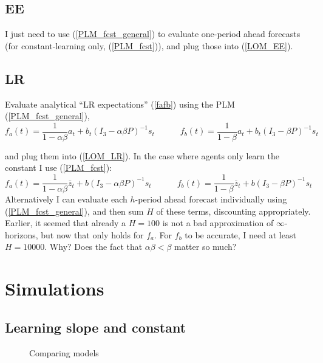 \documentclass[11pt]{article}
\def \myFigPath {../figures/}
\renewcommand{\[}{\begin{equation}}
\renewcommand{\]}{\end{equation}}
\def\myFigScale{0.3}
\begin{document}
\subsection{EE}
I just need to use (\ref{PLM_fcst_general}) to evaluate one-period ahead forecasts (for constant-learning only, (\ref{PLM_fcst})), and plug those into (\ref{LOM_EE}).

\subsection{LR}
Evaluate analytical ``LR expectations'' (\ref{fafb}) using the PLM (\ref{PLM_fcst_general}), 
\begin{equation}
f_a(t) = \frac{1}{1-\alpha\beta}a_{t}  + b_{t}(I_3 - \alpha\beta P)^{-1}s_t \quad \quad \quad f_b(t) = \frac{1}{1-\beta}a_{t}  + b_{t}(I_3 - \beta P)^{-1}s_t  \label{fafb_analytical_general}
\end{equation}

and plug them into (\ref{LOM_LR}). In the case where agents only learn the constant I use (\ref{PLM_fcst}):
\begin{equation}
f_a(t) = \frac{1}{1-\alpha\beta}\bar{z}_{t}  + b(I_3 - \alpha\beta P)^{-1}s_t \quad \quad \quad f_b(t) = \frac{1}{1-\beta}\bar{z}_{t}  + b(I_3 - \beta P)^{-1}s_t  \label{fafb_analytical}
\end{equation}
Alternatively I can evaluate each $h$-period ahead forecast individually using (\ref{PLM_fcst_general}), and then sum $H$ of these terms, discounting appropriately. Earlier, it seemed that already a $H=100$ is not a bad approximation of $\infty$-horizons, but now that only holds for $f_a$. For $f_b$ to be accurate, I need at least $H=10000$. Why? Does the fact that $\alpha\beta < \beta$ matter so much?

\newpage
\section{Simulations}	
\subsection{Learning slope and constant}
\begin{figure}[h!]
\caption{Comparing models}
\end{figure}
\end{document}
